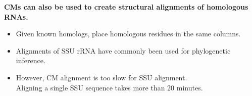 \documentclass[landscape]{slides}
\begin{document}
\begin{slide}
\begin{center}
\small
\textbf{CMs can also be used to create structural alignments of
    homologous RNAs.}
\end{center}
\medskip

\small
\begin{itemize}
  \item Given known homologs, place homologous residues in the same columns.
\end{itemize}


\begin{itemize}
\item Alignments of SSU rRNA have commonly been used for phylogenetic inference.



\item However, CM alignment is too slow for SSU alignment.
   \\ Aligning a single SSU sequence takes more than 20
    minutes.
\end{itemize}
\vfill
\end{slide}
\end{document}

